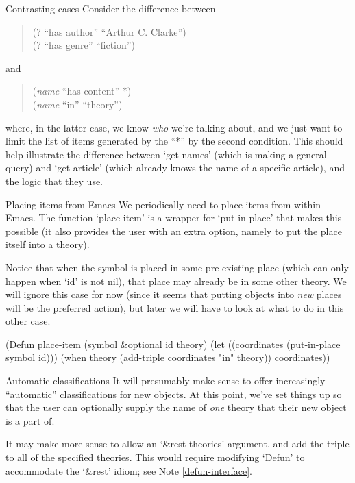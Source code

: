 \begin{notate}{Contrasting cases} \label{contrasting-cases}
Consider the difference between
\begin{quote}
(? ``has author'' ``Arthur C. Clarke'') \\
(? ``has genre'' ``fiction'')
\end{quote}
and
\begin{quote}
(\emph{name} ``has content'' *) \\
(\emph{name} ``in'' ``theory'')
\end{quote}
where, in the latter case, we know \emph{who} we're
talking about, and we just want to limit the list of items
generated by the ``*'' by the second condition.  This
should help illustrate the difference between `get-names'
(which is making a general query) and `get-article' (which
already knows the name of a specific article), and the
logic that they use.
\end{notate}

\begin{notate}{Placing items from Emacs} \label{place-item}
We periodically need to place items from within Emacs.
The function `place-item' is a wrapper for `put-in-place'
that makes this possible (it also provides the user with
an extra option, namely to put the place itself into a
theory).

Notice that when the symbol is placed in some pre-existing
place (which can only happen when `id' is not nil), that
place may already be in some other theory.  We will ignore
this case for now (since it seems that putting objects
into \emph{new} places will be the preferred action), but
later we will have to look at what to do in this other
case.
\end{notate}

\begin{elisp}
(Defun place-item (symbol &optional id theory)
  (let ((coordinates (put-in-place symbol id)))
    (when theory (add-triple coordinates "in" theory))
    coordinates))
\end{elisp}

\begin{notate}{Automatic classifications} \label{classifications}
It will presumably make sense to offer increasingly
``automatic'' classifications for new objects.  At this
point, we've set things up so that the user can optionally
supply the name of \emph{one} theory that their new object
is a part of.

It may make more sense to allow an `\&rest theories'
argument, and add the triple to all of the specified
theories.  This would require modifying `Defun' to
accommodate the `\&rest' idiom; see Note
\ref{defun-interface}.
\end{notate}

